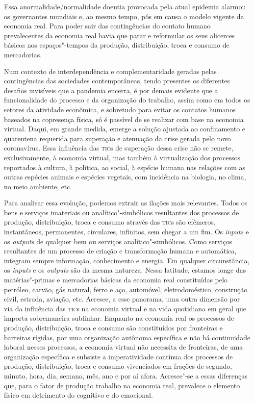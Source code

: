 Essa anormalidade/normalidade doentia provocada pela atual epidemia
alarmou os governantes mundiais e, ao mesmo tempo, pôs em causa o modelo
vigente da economia real. Para poder sair das contingências do contato
humano prevalecentes da economia real havia que parar e reformular os
seus alicerces básicos nos espaços"-tempos da produção, distribuição,
troca e consumo de mercadorias.

Num contexto de interdependência e complementaridade geradas pelas
contingências das sociedades contemporâneas, tendo presentes os
diferentes desafios invisíveis que a pandemia encerra, é por demais
evidente que a funcionalidade do processo e da organização do trabalho,
assim como em todos os setores da atividade econômica, e sobretudo para
evitar os contatos humanos baseados na copresença física, só é passível
de se realizar com base na economia virtual. Daqui, em grande medida,
emerge a solução ajustada ao confinamento e quarentena requerida para
superação e atenuação da crise gerada pelo novo coronavírus. Essa
influência das \textsc{tic}s de superação dessa crise não se remete,
exclusivamente, à economia virtual, mas também à virtualização dos
processos reportados à cultura, à política, ao social, à espécie humana
nas relações com as outras espécies animais e espécies vegetais, com
incidência na biologia, no clima, no meio ambiente, etc.

Para analisar essa evolução, podemos extrair as ilações mais relevantes.
Todos os bens e serviços imateriais ou analítico"-simbólicos resultantes
dos processos de produção, distribuição, troca e consumo através das
\textsc{tic}s são efêmeros, instantâneos, permanentes, circulares, infinitos, sem
chegar a um fim. Os \emph{inputs} e os \emph{outputs} de qualquer bem ou
serviços analítico"-simbólicos. Como serviços resultantes de um processo
de criação e transformação humana e automática, integram sempre
informação, conhecimento e energia. Em qualquer circunstância, os
\emph{inputs} e os \emph{outputs} são da mesma natureza. Nessa latitude,
estamos longe das matérias"-primas e mercadorias básicas da economia real
constituídas pelo petróleo, carvão, gás natural, ferro e aço, automóvel,
eletrodoméstico, construção civil, estrada, aviação, etc. Acresce, a
esse panorama, uma outra dimensão por via da influência das \textsc{tic}s na
economia virtual e na vida quotidiana em geral que importa sobremaneira
sublinhar. Enquanto na economia real os processos de produção,
distribuição, troca e consumo são constituídos por fronteiras e
barreiras rígidas, por uma organização autônoma específica e não há
continuidade laboral nesses processos, a economia virtual não necessita
de fronteiras, de uma organização específica e subsiste a imperatividade
contínua dos processos de produção, distribuição, troca e consumo
vivenciados em frações de segundo, minuto, hora, dia, semana, mês, ano e
por aí afora. Acresce"-se a essas diferenças que, para o fator de
produção trabalho na economia real, prevalece o elemento físico em
detrimento do cognitivo e do emocional.

